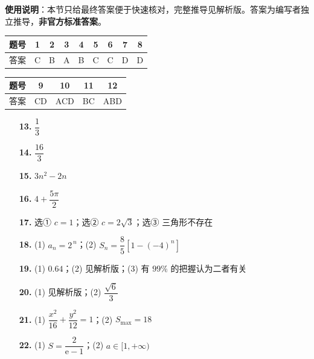 
\begin{gknotice}
\textbf{使用说明}：本节只给最终答案便于快速核对，完整推导见解析版。答案为编写者独立推导，\textbf{非官方标准答案}。
\end{gknotice}

\begin{center}\begin{tabular}{ccccccccc}
\toprule
题号 & 1 & 2 & 3 & 4 & 5 & 6 & 7 & 8 \\
\midrule
答案 & C & B & A & B & C & C & D & D \\
\bottomrule
\end{tabular}\end{center}

\begin{center}\begin{tabular}{ccccc}
\toprule
题号 & 9 & 10 & 11 & 12 \\
\midrule
答案 & CD & ACD & BC & ABD \\
\bottomrule
\end{tabular}\end{center}

\begin{itemize}[leftmargin=2.6em]
  \item[\textbf{13.}] $\dfrac13$
  \item[\textbf{14.}] $\dfrac{16}3$
  \item[\textbf{15.}] $3n^{2}-2n$
  \item[\textbf{16.}] $4+\dfrac{5\pi}2$
\end{itemize}

\begin{itemize}[leftmargin=2.6em]
  \item[\textbf{17.}] 选① $c=1$；选② $c=2\sqrt3$；选③ 三角形不存在
  \item[\textbf{18.}] (1) $a_n=2^{\,n}$；(2) $S_n=\dfrac85\left[1-(-4)^{n}\right]$
  \item[\textbf{19.}] (1) $0.64$；(2) 见解析版；(3) 有 $99\%$ 的把握认为二者有关
  \item[\textbf{20.}] (1) 见解析版；(2) $\dfrac{\sqrt6}3$
  \item[\textbf{21.}] (1) $\dfrac{x^{2}}{16}+\dfrac{y^{2}}{12}=1$；(2) $S_{\max}=18$
  \item[\textbf{22.}] (1) $S=\dfrac2{\mathrm e-1}$；(2) $a\in[1,+\infty)$
\end{itemize}
